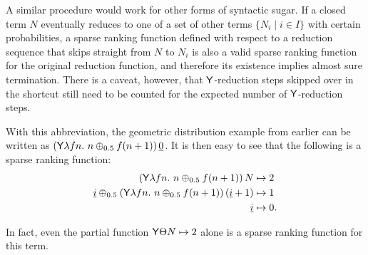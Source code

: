 A similar procedure would work for other forms of syntactic sugar. If a closed term $N$ eventually reduces to one of a set of other terms $\{N_i \mid i \in I\}$ with certain probabilities, a sparse ranking function defined with respect to a reduction sequence that skips straight from $N$ to $N_i$ is also a valid sparse ranking function for the original reduction function, and therefore its existence implies almost sure termination. There is a caveat, however, that $\mathsf{Y}$-reduction steps skipped over in the shortcut still need to be counted for the expected number of $\mathsf{Y}$-reduction steps.

With this abbreviation, the geometric distribution example from earlier can be written as $(\tY \lambda f n.\ n \oplus_{0.5} f(n+1)) \, \underline 0$. It is then easy to see that the following is a sparse ranking function:
\begin{align*}
(\mathsf{Y} \lambda f n.\ n \oplus_{0.5} f(n+1))\, N & \mapsto 2 \\
\underline i \oplus_{0.5} (\mathsf{Y} \lambda f n.\ n \oplus_{0.5} f(n+1))\, (\underline i + 1) & \mapsto 1 \\
\underline i & \mapsto 0.
\end{align*}

In fact, even the partial function $\mathsf{Y} \Theta N \mapsto 2$ alone is a sparse ranking function for this term.
